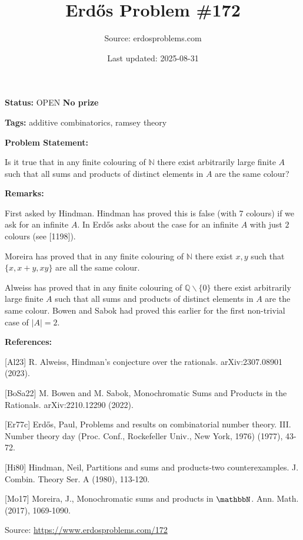 \documentclass{article}
\title{Erd\H{o}s Problem \#172}
\date{Last updated: 2025-08-31}
\author{Source: erdosproblems.com}
\begin{document}
\maketitle

\noindent\textbf{Status:} OPEN \quad \textbf{No prize}

\noindent\textbf{Tags:} additive combinatorics, ramsey theory

\medskip
\noindent\textbf{Problem Statement:}

Is it true that in any finite colouring of $\mathbb{N}$ there exist arbitrarily large finite $A$ such that all sums and products of distinct elements in $A$ are the same colour?

\bigskip
\noindent\textbf{Remarks:}

First asked by Hindman. Hindman \cite{Hi80} has proved this is false (with 7 colours) if we ask for an infinite $A$. In \cite{Er77c} Erd\H{o}s asks about the case for an infinite $A$ with just $2$ colours (see [1198]).

Moreira \cite{Mo17} has proved that in any finite colouring of $\mathbb{N}$ there exist $x,y$ such that $\{x,x+y,xy\}$ are all the same colour.

Alweiss \cite{Al23} has proved that in any finite colouring of $\mathbb{Q}\backslash \{0\}$ there exist arbitrarily large finite $A$ such that all sums and products of distinct elements in $A$ are the same colour. Bowen and Sabok \cite{BoSa22} had proved this earlier for the first non-trivial case of $\lvert A\rvert=2$.

\bigskip
\noindent\textbf{References:}

[Al23] R. Alweiss, Hindman's conjecture over the rationals. arXiv:2307.08901 (2023).
 
 [BoSa22] M. Bowen and M. Sabok, Monochromatic Sums and Products in the Rationals. arXiv:2210.12290 (2022).
 
 [Er77c] Erd\H{o}s, Paul, Problems and results on combinatorial number theory. III. Number theory day (Proc. Conf., Rockefeller Univ.,
New York, 1976) (1977), 43-72.
 
 [Hi80] Hindman, Neil, Partitions and sums and products-two counterexamples. J. Combin. Theory Ser. A (1980), 113-120.
 
 [Mo17] Moreira, J., Monochromatic sums and products in $\mathbbN$. Ann. Math. (2017), 1069-1090.

\bigskip
\noindent\small{Source: \url{https://www.erdosproblems.com/172}}
\end{document}

